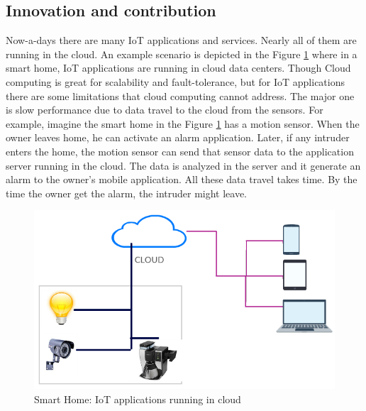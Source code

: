 





\subsection{Innovation and contribution}
Now-a-days there are many \ac{IoT} applications and services. Nearly all of them are running in the cloud. An example scenario is depicted in the Figure \ref{img:iotcloud} where in a smart home, \ac{IoT} applications are running in cloud data centers. Though Cloud computing is great for scalability and fault-tolerance, but for \ac{IoT} applications there are some limitations that cloud computing cannot address. 
The major one is slow performance due to data travel to the cloud from the sensors. For example, imagine the smart home in the Figure \ref{img:iotcloud} has a motion sensor. When the owner leaves home, he can activate an alarm application. Later, if any intruder enters the home, the motion sensor can send that sensor data to the application server running in the cloud. The data is analyzed in the server and it generate an alarm to the owner's mobile application. All these data travel takes time. By the time the owner get the alarm, the intruder might leave. 

\begin{figure}[H]
  \centering
  \includegraphics[width=.50\textwidth]{img/iot-cloud.png}
  \caption{Smart Home: IoT applications running in cloud}\label{img:iotcloud}
\end{figure}


